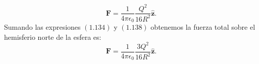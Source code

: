 \documentclass[11pt,fleqn]{book} %
\begin{document}
\begin{example}
\begin{equation}
\textbf{F}=\frac{1}{4\pi\epsilon_{0}} \frac{Q^{2}}{16R^{2}}\hat{\textbf{z}}.
\end{equation}
Sumando las expresiones $(1.134)$ y $(1.138)$ obtenemos la fuerza total sobre el hemisferio norte de la esfera es:
\begin{equation}
\textbf{F}=\frac{1}{4\pi\epsilon_{0}} \frac{3Q^{2}}{16R^{2}}\hat{\textbf{z}}.
\end{equation}
\end{example}





\cleardoublepage
\setlength{\columnsep}{0.75cm}
\printindex
\end{document}

